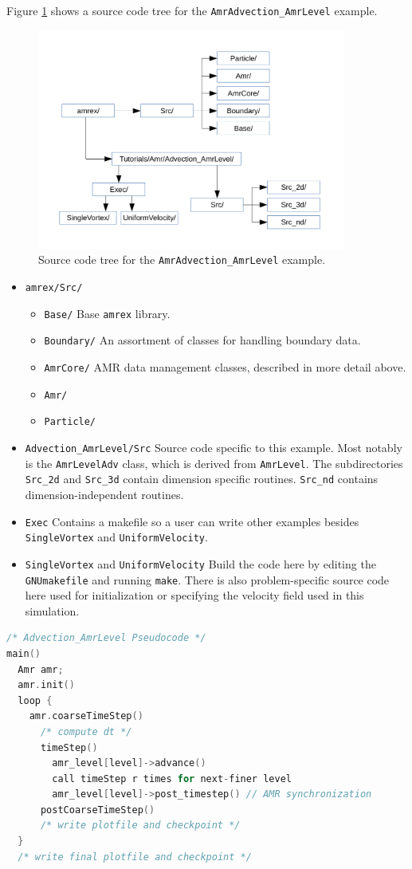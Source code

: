 Figure \ref{fig:AmrAdvection_AmrLevel_flowchart} shows a source
code tree for the {\tt AmrAdvection\_AmrLevel} example.
\begin{figure}[htb]
\begin{center}
\includegraphics[width=4in]{./AmrLevel/figs/flowchart.pdf}
\caption{\label{fig:AmrAdvection_AmrLevel_flowchart} Source code tree for the 
         {\tt AmrAdvection\_AmrLevel} example.}
\end{center}
\end{figure}
\begin{itemize}
\item {\tt amrex/Src/}
\begin{itemize}
\item {\tt Base/} Base {\tt amrex} library.
\item {\tt Boundary/} An assortment of classes for handling boundary data.
\item {\tt AmrCore/} AMR data management classes, described in more detail above.
\item {\tt Amr/}
\item {\tt Particle/}
\end{itemize}
\item {\tt Advection\_AmrLevel/Src} Source code specific to this example.  Most notably
is the {\tt AmrLevelAdv} class, which is derived from {\tt AmrLevel}.  The subdirectories {\tt Src\_2d}
and {\tt Src\_3d} contain dimension specific routines.  {\tt Src\_nd} contains dimension-independent routines.
\item {\tt Exec} Contains a makefile so a user can write other examples besides {\tt SingleVortex} and {\tt UniformVelocity}.
\item {\tt SingleVortex} and {\tt UniformVelocity}
Build the code here by editing the {\tt GNUmakefile} and running {\tt make}.  There
is also problem-specific source code here used for initialization or specifying the velocity field used in this
simulation.
\end{itemize}

\begin{lstlisting}[language=cpp]
/* Advection_AmrLevel Pseudocode */
main()
  Amr amr;
  amr.init()
  loop { 
    amr.coarseTimeStep()
      /* compute dt */
      timeStep()
        amr_level[level]->advance()
        call timeStep r times for next-finer level
        amr_level[level]->post_timestep() // AMR synchronization
      postCoarseTimeStep()
      /* write plotfile and checkpoint */
  }
  /* write final plotfile and checkpoint */
\end{lstlisting}
